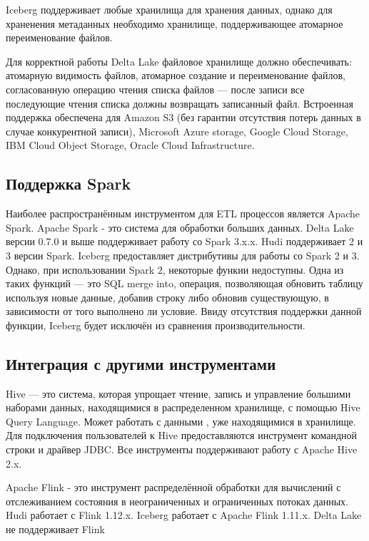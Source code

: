 \documentclass[%
bachelor,    %
subf,        %
href,        %
colorlinks,  %
]{disser}
\begin{document}
Iceberg поддерживает любые хранилища для хранения данных, однако для храненения метаданных необходимо хранилище, поддерживающее атомарное переименование файлов.

Для корректной работы Delta Lake файловое хранилище должно обеспечивать: атомарную видимость файлов, атомарное создание и переименование файлов, согласованную операцию чтения списка файлов --- после записи все последующие чтения списка должны возвращать записанный файл. Встроенная поддержка обеспечена для Amazon S3 (без гарантии отсутствия потерь данных в случае конкурентной записи), Microsoft Azure storage, Google Cloud Storage, IBM Cloud Object Storage, Oracle Cloud Infrastructure.

\subsection{Поддержка Spark}
Наиболее распространённым инструментом для ETL процессов является Apache Spark. Apache Spark - это система для обработки больших данных.\cite{spark}
Delta Lake версии 0.7.0 и выше поддерживает работу со Spark 3.x.x. Hudi поддерживает 2 и 3 версии Spark. Iceberg предоставляет дистрибутивы для работы со Spark 2 и 3. Однако, при использовании Spark 2, некоторые функии недоступны. Одна из таких функций --- это SQL merge into, операция, позволяющая обновить таблицу используя новые данные, добавив строку либо обновив существующую, в зависимости от того выполнено ли условие. Ввиду отсутствия поддержки данной функции, Iceberg будет исключён из сравнения производительности.

\subsection{Интеграция с другими инструментами}
Hive --- это система, которая упрощает чтение, запись и управление большими наборами данных, находящимися в распределенном хранилище, с помощью Hive Query Language. Может работать с данными , уже находящимися в хранилище. Для подключения пользователей к Hive предоставляются инструмент командной строки и драйвер JDBC.\cite{hive} Все инструменты поддерживают работу с Apache Hive 2.x.


Apache Flink - это инструмент распределённой обработки для вычислений с отслеживанием состояния в неограниченных и ограниченных потоках данных.\cite{flink}
Hudi работает с Flink 1.12.x. Iceberg работает с Apache Flink 1.11.x. Delta Lake не поддерживает Flink
\end{document}
